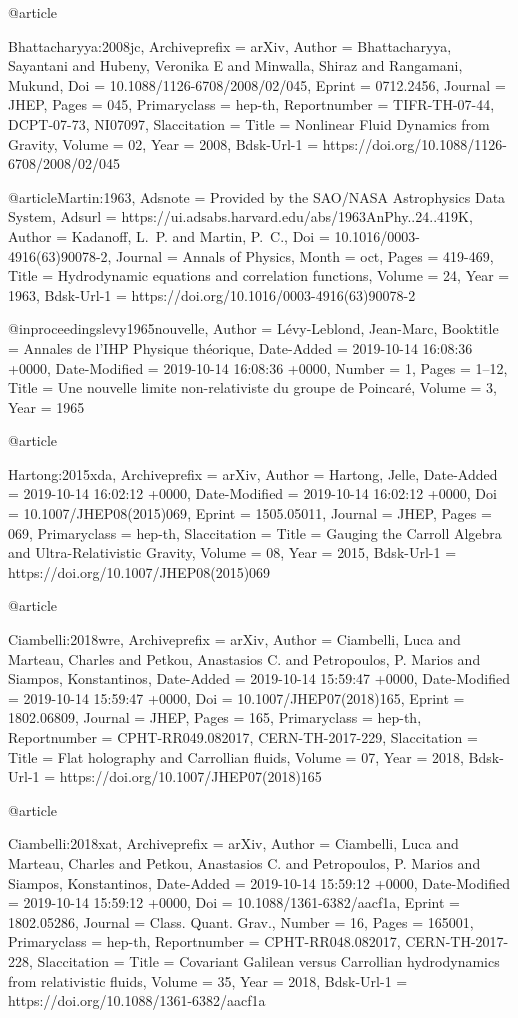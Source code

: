 \documentclass[superscriptaddress,prd,nofootinbib,preprintnumbers,longbibliography,11pt,eqsecnum]{revtex4-1}
\begin{document}
{{{{{{{{{{{{{{{@article{Bhattacharyya:2008jc,
	Archiveprefix = {arXiv},
	Author = {Bhattacharyya, Sayantani and Hubeny, Veronika E and Minwalla, Shiraz and Rangamani, Mukund},
	Doi = {10.1088/1126-6708/2008/02/045},
	Eprint = {0712.2456},
	Journal = {JHEP},
	Pages = {045},
	Primaryclass = {hep-th},
	Reportnumber = {TIFR-TH-07-44, DCPT-07-73, NI07097},
	Slaccitation = {Title = {{Nonlinear Fluid Dynamics from Gravity}},
	Volume = {02},
	Year = {2008},
	Bdsk-Url-1 = {https://doi.org/10.1088/1126-6708/2008/02/045}}

@article{Martin:1963,
	Adsnote = {Provided by the SAO/NASA Astrophysics Data System},
	Adsurl = {https://ui.adsabs.harvard.edu/abs/1963AnPhy..24..419K},
	Author = {{Kadanoff}, L.~P. and {Martin}, P.~C.},
	Doi = {10.1016/0003-4916(63)90078-2},
	Journal = {Annals of Physics},
	Month = oct,
	Pages = {419-469},
	Title = {{Hydrodynamic equations and correlation functions}},
	Volume = 24,
	Year = 1963,
	Bdsk-Url-1 = {https://doi.org/10.1016/0003-4916(63)90078-2}}

@inproceedings{levy1965nouvelle,
	Author = {L{\'e}vy-Leblond, Jean-Marc},
	Booktitle = {Annales de l'IHP Physique th{\'e}orique},
	Date-Added = {2019-10-14 16:08:36 +0000},
	Date-Modified = {2019-10-14 16:08:36 +0000},
	Number = {1},
	Pages = {1--12},
	Title = {Une nouvelle limite non-relativiste du groupe de Poincar{\'e}},
	Volume = {3},
	Year = {1965}}

@article{Hartong:2015xda,
	Archiveprefix = {arXiv},
	Author = {Hartong, Jelle},
	Date-Added = {2019-10-14 16:02:12 +0000},
	Date-Modified = {2019-10-14 16:02:12 +0000},
	Doi = {10.1007/JHEP08(2015)069},
	Eprint = {1505.05011},
	Journal = {JHEP},
	Pages = {069},
	Primaryclass = {hep-th},
	Slaccitation = {Title = {{Gauging the Carroll Algebra and Ultra-Relativistic Gravity}},
	Volume = {08},
	Year = {2015},
	Bdsk-Url-1 = {https://doi.org/10.1007/JHEP08(2015)069}}

@article{Ciambelli:2018wre,
	Archiveprefix = {arXiv},
	Author = {Ciambelli, Luca and Marteau, Charles and Petkou, Anastasios C. and Petropoulos, P. Marios and Siampos, Konstantinos},
	Date-Added = {2019-10-14 15:59:47 +0000},
	Date-Modified = {2019-10-14 15:59:47 +0000},
	Doi = {10.1007/JHEP07(2018)165},
	Eprint = {1802.06809},
	Journal = {JHEP},
	Pages = {165},
	Primaryclass = {hep-th},
	Reportnumber = {CPHT-RR049.082017, CERN-TH-2017-229},
	Slaccitation = {Title = {{Flat holography and Carrollian fluids}},
	Volume = {07},
	Year = {2018},
	Bdsk-Url-1 = {https://doi.org/10.1007/JHEP07(2018)165}}

@article{Ciambelli:2018xat,
	Archiveprefix = {arXiv},
	Author = {Ciambelli, Luca and Marteau, Charles and Petkou, Anastasios C. and Petropoulos, P. Marios and Siampos, Konstantinos},
	Date-Added = {2019-10-14 15:59:12 +0000},
	Date-Modified = {2019-10-14 15:59:12 +0000},
	Doi = {10.1088/1361-6382/aacf1a},
	Eprint = {1802.05286},
	Journal = {Class. Quant. Grav.},
	Number = {16},
	Pages = {165001},
	Primaryclass = {hep-th},
	Reportnumber = {CPHT-RR048.082017, CERN-TH-2017-228},
	Slaccitation = {Title = {{Covariant Galilean versus Carrollian hydrodynamics from relativistic fluids}},
	Volume = {35},
	Year = {2018},
	Bdsk-Url-1 = {https://doi.org/10.1088/1361-6382/aacf1a}}

}}}}}}}}}}}}}}}}}}}
\end{document}

